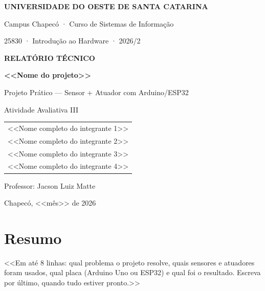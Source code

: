 \documentclass[12pt,a4paper]{article}
\begin{document}
\begin{titlepage}
  \centering
  {\large\bfseries\color{unoescazul} UNIVERSIDADE DO OESTE DE SANTA CATARINA\par}
  {\normalsize Campus Chapecó · Curso de Sistemas de Informação\par}
  {\normalsize 25830 · Introdução ao Hardware · 2026/2\par}
  \vspace{3cm}

  {\Large\bfseries\color{unoescazul} RELATÓRIO TÉCNICO\par}
  \vspace{0.6cm}
  {\LARGE\bfseries <<Nome do projeto>>\par}
  \vspace{0.4cm}
  {\large Projeto Prático — Sensor + Atuador com Arduino/ESP32\par}
  \vspace{0.3cm}
  {\normalsize Atividade Avaliativa III\par}
  \vspace{3cm}

  \begin{tabular}{l}
    <<Nome completo do integrante 1>> \\
    <<Nome completo do integrante 2>> \\
    <<Nome completo do integrante 3>> \\
    <<Nome completo do integrante 4>> \\
  \end{tabular}
  \vspace{2cm}

  {\normalsize Professor: Jacson Luiz Matte\par}
  \vfill
  {\normalsize Chapecó, <<mês>> de 2026\par}
\end{titlepage}

\section*{Resumo}
<<Em até 8 linhas: qual problema o projeto resolve, quais sensores e atuadores foram usados,
qual placa (Arduino Uno ou ESP32) e qual foi o resultado. Escreva por último, quando tudo
estiver pronto.>>
\end{document}
